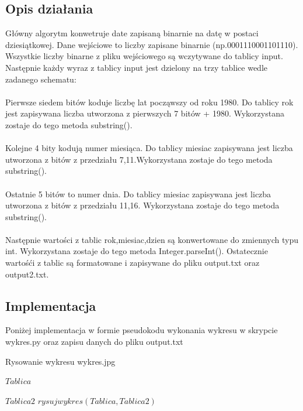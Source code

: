 \documentclass[12pt,a4paper]{article}
\begin{document}
	\subsection*{Opis działania} 
Główny algorytm konwetruje date zapisaną binarnie na datę w postaci dziesiątkowej. Dane wejściowe to liczby zapisane binarnie (np.0001110001101110). Wszystkie liczby binarne z pliku wejściowego są wczytywane do tablicy input. Następnie każdy wyraz z tablicy input jest dzielony na trzy tablice wedle zadanego schematu:
\\
\\
Pierwsze siedem bitów koduje liczbę lat począwszy od roku 1980. Do tablicy rok jest zapisywana liczba utworzona z pierwszych 7 bitów + 1980. Wykorzystana zostaje do tego metoda substring().
\\
\\
Kolejne 4 bity kodują numer miesiąca. Do tablicy miesiac zapisywana jest liczba utworzona z bitów z przedziału 7,11.Wykorzystana zostaje do tego metoda substring().
\\
\\
Ostatnie 5 bitów to numer dnia. Do tablicy miesiac zapisywana jest liczba utworzona z bitów z przedziału 11,16.
Wykorzystana zostaje do tego metoda substring().
\\
\\
Następnie wartości z tablic rok,miesiac,dzien są konwertowane do zmiennych typu int. Wykorzystana zostaje do tego metoda Integer.parseInt().
Ostatecznie wartośći z tablic są formatowane i zapisywane do pliku output.txt oraz output2.txt.




	\subsection*{Implementacja}
Poniżej implementacja w formie pseudokodu wykonania wykresu w skrypcie wykres.py oraz  zapisu danych do pliku output.txt

\begin{algorithm}[H]
	\caption{Rysowanie wykresu wykres.jpg}
	\BlankLine
	
		
\Return $Tablica$

		
\Return $Tablica2$
	\BlankLine
$rysujwykres(Tablica,Tablica2)$


	\end{algorithm}
    
\end{document}

